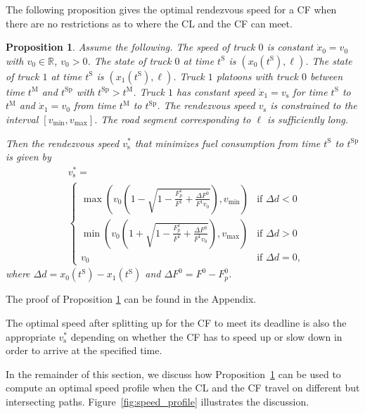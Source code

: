 \documentclass[letterpaper,10pt,conference,twocolumn]{IEEEtran}
\newcommand{\op}[1]{\mathrm{#1}}
\newtheorem{prop}{Proposition}
\theoremstyle{definition}
\begin{document}
The following proposition gives the optimal rendezvous speed for a CF when there are no restrictions as to where the CL and the CF can meet.
\begin{prop}\label{prop:unconstrained_vs}
  Assume the following.
  The speed of truck $0$ is constant $\dot{x}_0 = v_0$ with $v_0 \in \mathbb{R}$, $v_0 > 0$. The state of truck $0$ at time $t^\op{S}$ is $(x_0(t^\op{S}),\ell)$. 
  The state of truck $1$ at time $t^\op{S}$ is $(x_1(t^\op{S}),\ell)$. 
  Truck $1$ platoons with truck $0$ between time $t^\op{M}$ and $t^\op{Sp}$ with $t^\op{Sp} > t^\op{M}$. Truck $1$ has constant speed $\dot{x}_1 = v_\op{s}$ for time $t^\op{S}$ to $t^\op{M}$ and $\dot{x}_1 = v_0$ from time $t^\op{M}$ to $t^\op{Sp}$. The rendezvous speed $v_\op{s}$ is constrained to the interval $[v_{\min},v_{\max}]$. The road segment corresponding to $\ell$ is sufficiently long. 
  
  Then the rendezvous speed $v_\op{s}^*$ that minimizes fuel consumption from time $t^\op{S}$ to $t^\op{Sp}$ is given by
  \begin{equation}
  \begin{split}
  &v_\op{s}^* =\\
  &\left\{
  \begin{array}{ll}
    \max \left(v_{0}\left(1 - \sqrt{1 - \frac{F_p^1}{F^1} + \frac{\Delta F^0}{F^1 v_{0}}}\right), v_{\min}\right) &\text{if } \Delta d < 0\\
    \min \left(v_{0}\left(1 + \sqrt{1 - \frac{F_p^1}{F^1} + \frac{\Delta F^0}{F^1 v_{0}}}\right), v_{\max}\right) &\text{if } \Delta d > 0\\
    v_{0} &\text{if } \Delta d = 0,
  \end{array}
  \right.
  \end{split}
  \end{equation}
  where $\Delta d = x_0(t^\op{S}) - x_1(t^\op{S})$ and $\Delta F^0 = F^0 - F_p^0$.
\end{prop}
The proof of Proposition \ref{prop:unconstrained_vs} can be found in the Appendix.

The optimal speed after splitting up for the CF to meet its deadline is also the appropriate $v_\op{s}^*$ depending on whether the CF has to speed up or slow down in order to arrive at the specified time. 

In the remainder of this section, we discuss how Proposition~\ref{prop:unconstrained_vs} can be used to compute an optimal speed profile when the CL and the CF travel on different but intersecting paths. Figure~\ref{fig:speed_profile} illustrates the discussion. 
\end{document}
